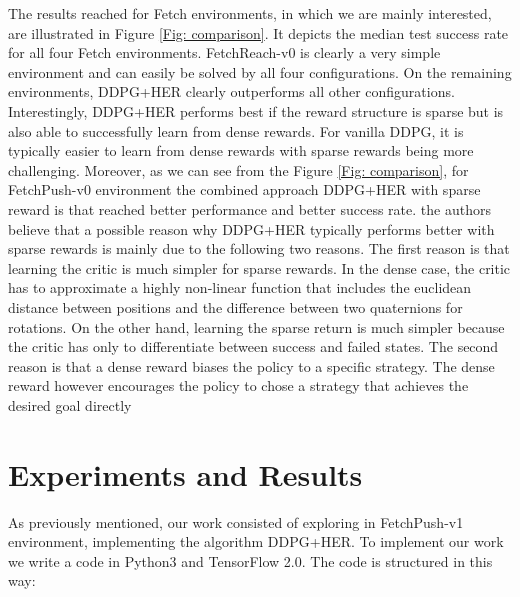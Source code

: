 \documentclass[a4paper]{report}
\begin{document}
The results reached for Fetch environments, in which we are mainly interested, are illustrated in Figure \ref{Fig: comparison}. It depicts the median test success rate for all four Fetch environments. FetchReach-v0 is clearly a very simple environment and can easily be solved by all four configurations. On the remaining environments, DDPG+HER clearly outperforms all other configurations. Interestingly, DDPG+HER performs best if the reward structure is sparse but is also able to successfully learn from dense rewards. For vanilla DDPG, it is typically easier to learn from dense rewards with sparse rewards being more challenging. Moreover, as we can see from the Figure \ref{Fig: comparison}, for FetchPush-v0 environment the combined approach DDPG+HER with sparse reward is that reached better performance and better success rate. the authors believe that a possible reason why DDPG+HER typically performs better with sparse rewards is mainly due to the following two reasons. The first reason is that learning the critic is much simpler for sparse rewards. In the dense case, the critic has to approximate a highly non-linear function that includes the euclidean distance between positions and the difference between two quaternions for rotations. On the other hand, learning the sparse return is much simpler because the critic has only to differentiate between success and failed states.
The second reason is that a dense reward biases the policy to a specific strategy. The dense reward however encourages the policy to chose a strategy that achieves the desired goal directly
 







\chapter{Experiments and Results \label{exp}}

As previously  mentioned, our work consisted of exploring in FetchPush-v1 environment, implementing the algorithm DDPG+HER. To implement our work we write a code in Python3 and TensorFlow 2.0. The code is structured in this way:
\end{document}
